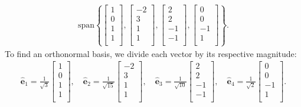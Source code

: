 \begin{align}
  \text{span} \left\{
  \left[ \begin{array}{c}  1 \\  0 \\  1 \\  1 \\ \end{array} \right] ,
  \left[ \begin{array}{c} -2 \\  3 \\  1 \\  1 \\ \end{array} \right] ,
  \left[ \begin{array}{c}  2 \\  2 \\ -1 \\ -1 \\ \end{array} \right] ,
  \left[ \begin{array}{c}  0 \\  0 \\ -1 \\  1 \\ \end{array} \right] \right\} . \nonumber
\end{align}
To find an orthonormal basis, we divide each vector by its respective magnitude:
\begin{align}
  \hat{\mathbf{e}}_1 = \frac{1}{\sqrt{3}}  \left[ \begin{array}{c}  1 \\  0 \\  1 \\  1 \\ \end{array} \right] , \quad
  \hat{\mathbf{e}}_2 = \frac{1}{\sqrt{15}} \left[ \begin{array}{c} -2 \\  3 \\  1 \\  1 \\ \end{array} \right] , \quad
  \hat{\mathbf{e}}_3 = \frac{1}{\sqrt{10}} \left[ \begin{array}{c}  2 \\  2 \\ -1 \\ -1 \\ \end{array} \right] , \quad
  \hat{\mathbf{e}}_4 = \frac{1}{\sqrt{2}}  \left[ \begin{array}{c}  0 \\  0 \\ -1 \\  1 \\ \end{array} \right]  . 
\end{align}


